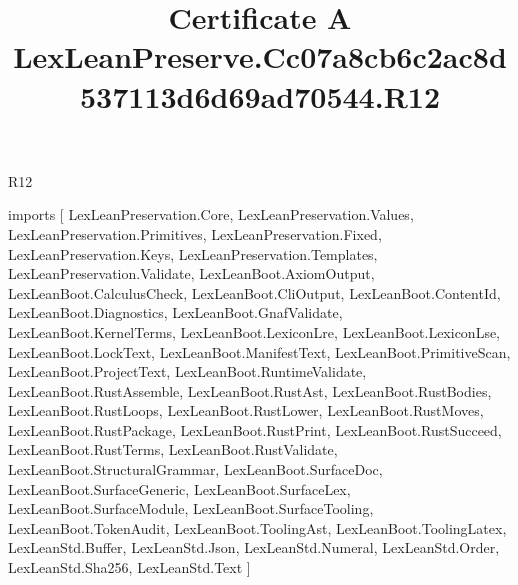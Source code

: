\begin{lexlean}{R12}
\title{Certificate A LexLeanPreserve.Cc07a8cb6c2ac8d537113d6d69ad70544.R12}
\begin{coremodule}
imports [
  LexLeanPreservation.Core,
  LexLeanPreservation.Values,
  LexLeanPreservation.Primitives,
  LexLeanPreservation.Fixed,
  LexLeanPreservation.Keys,
  LexLeanPreservation.Templates,
  LexLeanPreservation.Validate,
  LexLeanBoot.AxiomOutput,
  LexLeanBoot.CalculusCheck,
  LexLeanBoot.CliOutput,
  LexLeanBoot.ContentId,
  LexLeanBoot.Diagnostics,
  LexLeanBoot.GnafValidate,
  LexLeanBoot.KernelTerms,
  LexLeanBoot.LexiconLre,
  LexLeanBoot.LexiconLse,
  LexLeanBoot.LockText,
  LexLeanBoot.ManifestText,
  LexLeanBoot.PrimitiveScan,
  LexLeanBoot.ProjectText,
  LexLeanBoot.RuntimeValidate,
  LexLeanBoot.RustAssemble,
  LexLeanBoot.RustAst,
  LexLeanBoot.RustBodies,
  LexLeanBoot.RustLoops,
  LexLeanBoot.RustLower,
  LexLeanBoot.RustMoves,
  LexLeanBoot.RustPackage,
  LexLeanBoot.RustPrint,
  LexLeanBoot.RustSucceed,
  LexLeanBoot.RustTerms,
  LexLeanBoot.RustValidate,
  LexLeanBoot.StructuralGrammar,
  LexLeanBoot.SurfaceDoc,
  LexLeanBoot.SurfaceGeneric,
  LexLeanBoot.SurfaceLex,
  LexLeanBoot.SurfaceModule,
  LexLeanBoot.SurfaceTooling,
  LexLeanBoot.TokenAudit,
  LexLeanBoot.ToolingAst,
  LexLeanBoot.ToolingLatex,
  LexLeanStd.Buffer,
  LexLeanStd.Json,
  LexLeanStd.Numeral,
  LexLeanStd.Order,
  LexLeanStd.Sha256,
  LexLeanStd.Text
]


\end{coremodule}
\end{lexlean}
